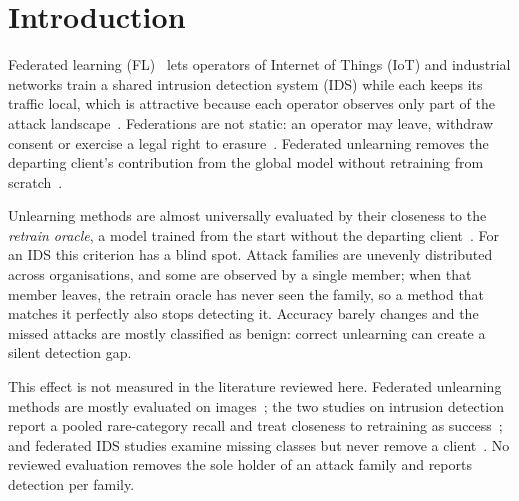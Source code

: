 \documentclass[pdflatex,sn-mathphys-num,iicol]{sn-jnl}
\begin{document}

\maketitle

\section{Introduction}\label{sec:intro}

Federated learning (FL)~\cite{mcmahan2017} lets operators of Internet of Things (IoT) and industrial networks train a shared intrusion detection system (IDS) while each keeps its traffic local, which is attractive because each operator observes only part of the attack landscape~\cite{bilal2026,peng2025fdids,chunduru2025}. Federations are not static: an operator may leave, withdraw consent or exercise a legal right to erasure~\cite{gdpr2016}. Federated unlearning removes the departing client's contribution from the global model without retraining from scratch~\cite{cao2015,bourtoule2021,liu2021federaser,halimi2022,wu2022distill}.

Unlearning methods are almost universally evaluated by their closeness to the \emph{retrain oracle}, a model trained from the start without the departing client~\cite{liu2021federaser,halimi2022,liu2025starfish,yang2026arfu}. For an IDS this criterion has a blind spot. Attack families are unevenly distributed across organisations, and some are observed by a single member; when that member leaves, the retrain oracle has never seen the family, so a method that matches it perfectly also stops detecting it. Accuracy barely changes and the missed attacks are mostly classified as benign: correct unlearning can create a silent detection gap.

This effect is not measured in the literature reviewed here. Federated unlearning methods are mostly evaluated on images~\cite{kwon2026,patra2026,wang2025fedbt,liu2025starfish,zhang2025cgkd}; the two studies on intrusion detection report a pooled rare-category recall and treat closeness to retraining as success~\cite{yang2026arfu,wang2026fuids}; and federated IDS studies examine missing classes but never remove a client~\cite{bilal2026,chunduru2025,peng2025fdids}. No reviewed evaluation removes the sole holder of an attack family and reports detection per family.
\end{document}
